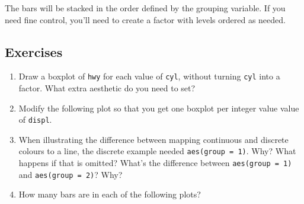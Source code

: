 The bars will be stacked in the order defined by the grouping variable.
If you need fine control, you'll need to create a factor with levels
ordered as needed.

\subsection{Exercises}

\begin{enumerate}
\def\labelenumi{\arabic{enumi}.}
\item
  Draw a boxplot of \texttt{hwy} for each value of \texttt{cyl}, without
  turning \texttt{cyl} into a factor. What extra aesthetic do you need
  to set?
\item
  Modify the following plot so that you get one boxplot per integer
  value value of \texttt{displ}.

\begin{Shaded}
\begin{Highlighting}[]
\StringTok{ }
\StringTok{  }\NormalTok{()}
\end{Highlighting}
\end{Shaded}
\item
  When illustrating the difference between mapping continuous and
  discrete colours to a line, the discrete example needed
  \texttt{aes(group\ =\ 1)}. Why? What happens if that is omitted?
  What's the difference between \texttt{aes(group\ =\ 1)} and
  \texttt{aes(group\ =\ 2)}? Why?
\item
  How many bars are in each of the following plots?

\begin{Shaded}
\end{Shaded}


\end{enumerate}
